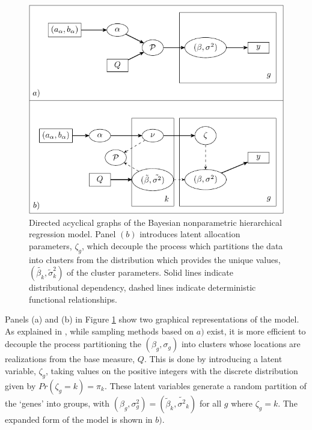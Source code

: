 {\begin{figure}
\includegraphics[width=.8\textwidth]{my_dag}
\caption{\small Directed acyclical graphs of the Bayesian nonparametric hierarchical regression model. Panel $(b)$ introduces latent allocation parameters, $\zeta_g$, which decouple the process which partitions the data into clusters from the distribution which provides the unique values, $(\tilde{\beta_k},\tilde{\sigma}_k^2)$ of the cluster parameters. Solid lines indicate distributional dependency, dashed lines indicate deterministic functional relationships.}
\label{dag}
\end{figure}

Panels (a) and (b) in Figure \ref{dag} show two graphical representations of the model. As explained in \cite{neal2000}, while sampling methods based on $a)$ exist, it is more efficient to decouple the process partitioning the $(\beta_g,\sigma_g)$ into clusters whose locations are realizations from the base measure, $Q$. This is done by introducing a latent variable, $\zeta_g$, taking values on the positive integers with the discrete distribution given by $Pr(\zeta_g=k)=\pi_k$. These latent variables generate a random partition of the `genes' into groups, with $(\beta_g,\sigma^2_g)=(\tilde{\beta}_k,\tilde{\sigma^2}_k)$ for all $g$ where $\zeta_g=k$. The expanded form of the model is shown in $b)$.

}
